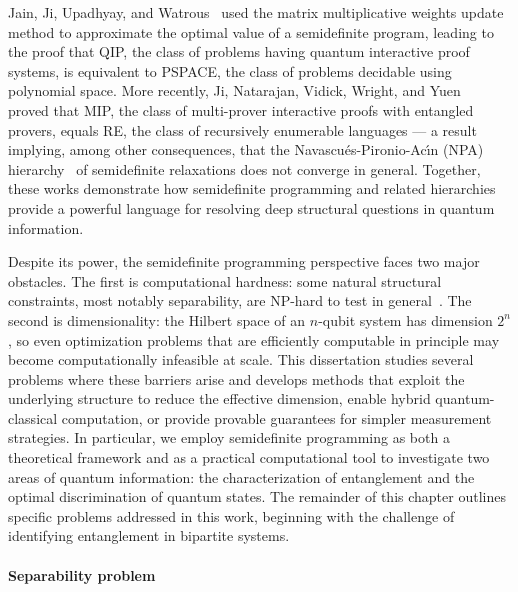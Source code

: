Jain, Ji, Upadhyay, and Watrous~\cite{jain2011qip} used the matrix multiplicative weights update method to approximate the optimal value of a semidefinite program, leading to the proof that QIP, the class of problems having quantum interactive proof systems, is equivalent to PSPACE, the class of problems decidable using polynomial space. 
More recently, Ji, Natarajan, Vidick, Wright, and Yuen~\cite{ji2021mip} proved that MIP\*, the class of multi-prover interactive proofs with entangled provers, equals RE, the class of recursively enumerable languages — a result implying, among other consequences, that the Navascu{\'e}s-Pironio-Ac{\'\i}n (NPA) hierarchy~\cite{navascues2007bounding} of semidefinite relaxations does not converge in general.
Together, these works demonstrate how semidefinite programming and related hierarchies provide a powerful language for resolving deep structural questions in quantum information.

Despite its power, the semidefinite programming perspective faces two major obstacles. 
The first is computational hardness: some natural structural constraints, most notably separability, are NP-hard to test in general~\cite{gurvits2004classical,gharibian2010strong}. 
The second is dimensionality: the Hilbert space of an $n$-qubit system has dimension $2^n$, so even optimization problems that are efficiently computable in principle may become computationally infeasible at scale. 
This dissertation studies several problems where these barriers arise and develops methods that exploit the underlying structure to reduce the effective dimension, enable hybrid quantum-classical computation, or provide provable guarantees for simpler measurement strategies. 
In particular, we employ semidefinite programming as both a theoretical framework and as a practical computational tool to investigate two areas of quantum information: the characterization of entanglement and the optimal discrimination of quantum states. 
The remainder of this chapter outlines specific problems addressed in this work, beginning with the challenge of identifying entanglement in bipartite systems.


\paragraph{Separability problem}

